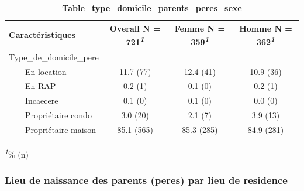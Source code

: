 \documentclass[
]{article}
\begin{document}
\newpage
\begin{table}[!t]
\caption{\label{tab:unnamed-chunk-39}\textbf{Table\_type\_domicile\_parents\_peres\_sexe}} 
\fontsize{12.0pt}{14.4pt}\selectfont
\begin{tabular*}{\linewidth}{@{\extracolsep{\fill}}lccc}
\toprule
\textbf{Caractéristiques} & \textbf{Overall}  N = 721\textsuperscript{\textit{1}} & \textbf{Femme}  N = 359\textsuperscript{\textit{1}} & \textbf{Homme}  N = 362\textsuperscript{\textit{1}} \\ 
\midrule\addlinespace[2.5pt]
Type\_de\_domicile\_pere &  &  &  \\ 
    En location & 11.7 (77) & 12.4 (41) & 10.9 (36) \\ 
    En RAP & 0.2 (1) & 0.1 (0) & 0.2 (1) \\ 
    Incaecere & 0.1 (0) & 0.1 (0) & 0.0 (0) \\ 
    Propriétaire condo & 3.0 (20) & 2.1 (7) & 3.9 (13) \\ 
    Propriétaire maison & 85.1 (565) & 85.3 (285) & 84.9 (281) \\ 
\bottomrule
\end{tabular*}
\begin{minipage}{\linewidth}
\textsuperscript{\textit{1}}\% (n)\\
\end{minipage}
\end{table}
\vspace{2cm}

\hypertarget{lieu-de-naissance-des-parents-peres-par-lieu-de-residence}{%
\subsubsection{Lieu de naissance des parents (peres) par lieu de
residence}\label{lieu-de-naissance-des-parents-peres-par-lieu-de-residence}}
\end{document}
